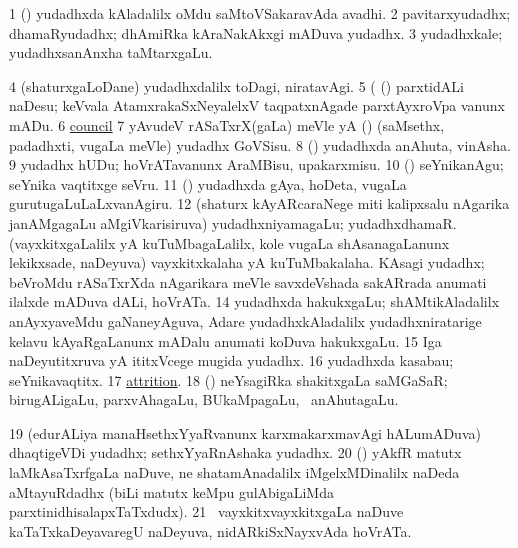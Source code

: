 \noindent 
\gl{\pagu}
\expl{}
\bmng
\bnum
\num{1}  (\AmA) yudadhxda kAladalilx oMdu saMtoVSakaravAda avadhi. 
\num{2}  pavitarxyudadhx; dhamaRyudadhx; dhAmiRka kAraNakAkxgi mADuva yudadhx. 
\num{3}  yudadhxkale; yudadhxsanAnxha taMtarxgaLu. 
\num{4}  (shaturxgaLoDane) yudadhxdalilx toDagi, niratavAgi. 
\num{5}  (  (\rUpa) parxtidALi naDesu; keVvala AtamxrakaSxNeyalelxV taqpatxnAgade parxtAyxroVpa \mo vanunx mADu. 
\num{6} \hyperref{kandict_c.pdf}{C}{council pagu(3)}{council}  
\num{7}  yAvudeV rASaTxrX(gaLa) meVle yA (\rUpa) (saMsethx, padadhxti, \mo vugaLa meVle) yudadhx GoVSisu. 
\num{8}  (\kAparx) yudadhxda anAhuta, vinAsha. 
\num{9}  yudadhx hUDu; hoVrATavanunx AraMBisu, upakarxmisu. 
\num{10}  (\pArxparx) seYnikanAgu; seYnika vaqtitxge seVru. 
\num{11}  (\AmA) yudadhxda gAya, hoDeta, \mo vugaLa gurutugaLuLaLxvanAgiru. 
\num{12}  (shaturx kAyARcaraNege miti kalipxsalu nAgarika janAMgagaLu aMgiVkarisiruva) yudadhxniyamagaLu; yudadhxdhamaR. 
  
\banum
{} (vayxkitxgaLalilx yA kuTuMbagaLalilx, kole \mo vugaLa shAsanagaLanunx lekikxsade, naDeyuva) vayxkitxkalaha yA kuTuMbakalaha. 
 KAsagi yudadhx; beVroMdu rASaTxrXda nAgarikara meVle savxdeVshada sakARrada anumati ilalxde mADuva dALi, hoVrATa. 
\eanum
\numie
\num{14}  yudadhxda hakukxgaLu; shAMtikAladalilx anAyxyaveMdu gaNaneyAguva, Adare yudadhxkAladalilx yudadhxniratarige kelavu kAyaRgaLanunx mADalu anumati koDuva hakukxgaLu. 
\num{15}  Iga naDeyutitxruva yA ititxVcege mugida yudadhx. 
\num{16}  yudadhxda kasabau; seYnikavaqtitx. 
\num{17}  \hyperref{kandict_a.pdf}{A}{attrition pagu}{attrition}. 
\num{18}  (\kAparx) neYsagiRka shakitxgaLa saMGaSaR; birugALigaLu, parxvAhagaLu, BUkaMpagaLu, \mo\ anAhutagaLu. 
\num{19}  (edurALiya manaHsethxYyaRvanunx karxmakarxmavAgi hALumADuva) dhaqtigeVDi yudadhx; sethxYyaRnAshaka yudadhx. 
\num{20}  (\ca) yAkfR matutx laMkAsaTxrfgaLa naDuve, ne shatamAnadalilx iMgelxMDinalilx naDeda aMtayuRdadhx (biLi matutx keMpu gulAbigaLiMda parxtinidhisalapxTaTxdudx). 
\num{21}  \kanmu\ vayxkitxvayxkitxgaLa naDuve kaTaTxkaDeyavaregU naDeyuva, nidARkiSxNayxvAda hoVrATa. 
\enum
\emng
\eentry

